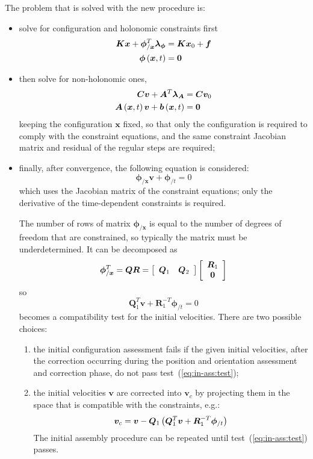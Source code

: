\documentclass[10pt,fleqn,subeqn]{report}
\newcommand{\T}[1]{\bm{#1}}
\newcommand{\TT}[1]{\bm{#1}}
\begin{document}
The problem that is solved with the new procedure is:
\begin{itemize}
\item solve for configuration and holonomic constraints first
\begin{align}
	\TT{K} \T{x} + \T{\phi}_{/\T{x}}^T \T{\lambda}_{\T{\phi}}
		& = \TT{K} \T{x}_0 + \T{f} \\
	\T{\phi}\plbr{\T{x}, t} & = \T{0}
\end{align}

\item then solve for non-holonomic ones,
\begin{align}
	\TT{C} \T{v} + \TT{A}^T \T{\lambda}_{\TT{A}} & = \TT{C} \T{v}_0 \\
	\TT{A}\plbr{\T{x}, t} \T{v} + \T{b}\plbr{\T{x}, t} & = \T{0}
\end{align}
keeping the configuration $\T{x}$ fixed,
so that only the configuration is required to comply 
with the constraint equations, and the same constraint 
Jacobian matrix and residual of the regular steps are required;

\item
finally, after convergence, the following equation is considered:
\begin{equation}
	\T{\phi}_{/\T{x}} \T{v} + \T{\phi}_{/t} = 0
\end{equation}
which uses the Jacobian matrix of the constraint equations; 
only the derivative of the time-dependent constraints is required.

The number of rows of matrix $\T{\phi}_{/\T{x}}$ is equal to the number 
of degrees of freedom that are constrained, so typically the matrix 
must be underdetermined.
It can be decomposed as
\begin{equation}
	\T{\phi}_{/\T{x}}^T = \T{Q} \T{R}
		= \sqbr{\matr{cc}{\T{Q}_1 & \T{Q}_2}}\sqbr{\cvvect{\T{R}_1 \\ \T{0}}}
\end{equation}
so
\begin{equation}
	\T{Q}_1^T \T{v} + \T{R}_1^{-T} \T{\phi}_{/t} = 0
	\label{eq:in-ass:test}
\end{equation}
becomes a compatibility test for the initial velocities.
There are two possible choices:
\begin{enumerate}
\item the initial configuration assessment fails if the given 
initial velocities, after the correction occurring during the position 
and orientation assessment and correction phase, do not pass 
test~(\ref{eq:in-ass:test});
\item the initial velocities $\T{v}$ are corrected into $\T{v}_c$ 
by projecting them in the space that is compatible with the constraints, 
e.g.:
\begin{equation}
	\T{v}_c = \T{v} - \T{Q}_1 \plbr{\T{Q}_1^T \T{v} + \T{R}_1^{-T}\T{\phi}_{/t}}
\end{equation}
The initial assembly procedure can be repeated until 
test~(\ref{eq:in-ass:test}) passes.
\end{enumerate}
\end{itemize}
\end{document}
